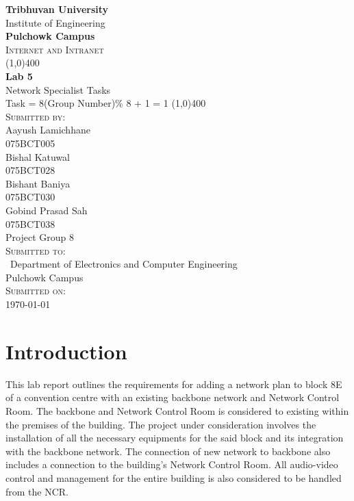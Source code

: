 \documentclass[12pt]{article}
\begin{document}
\begin{titlepage}
    \begin{center}
        \huge{\bfseries  Tribhuvan University}\\
        \Large{Institute of Engineering}\\
        \huge{ \bfseries  Pulchowk Campus}\\[3.2cm]


        \textsc{\Large Internet and Intranet}\\[-0.5cm]
        \line(1,0){400}\\
        \huge{\bfseries Lab 5}\\
        \large{Network Specialist Tasks \\ Task = 8(Group Number)\% 8 + 1 = 1  }
        \line(1,0){400}\\


        \textsc{\Large Submitted by:}\\
        \Large Aayush Lamichhane\\ \large 075BCT005\\   [0.85cm]
        \Large Bishal Katuwal\\ \large 075BCT028\\   [0.85cm]
        \Large Bishant Baniya\\ \large 075BCT030\\   [0.85cm]
        \Large Gobind Prasad Sah\\ \large 075BCT038\\ Project Group 8\\   [0.85cm]
        \textsc{\Large Submitted to:}\\\
        \large Department of Electronics and Computer Engineering\\Pulchowk Campus\\    [0.85cm]
        
        \textsc{\Large Submitted on:}\\
        \today
        
    \end{center}
\end{titlepage}
\pagebreak

\tableofcontents
\pagebreak

\section{Introduction}
This lab report outlines the requirements for adding a network plan to block 8E of
a convention centre with an existing backbone network and Network Control Room.
The backbone and Network Control Room is considered to existing within the premises
of the building. 
The project under consideration involves the installation of all the necessary 
equipments for the said block and its integration with the backbone network. 
The connection of new network to backbone also includes a connection to the building's
Network Control Room.  
All audio-video control and management for the entire building 
is also considered to be handled from the NCR.
\end{document}
